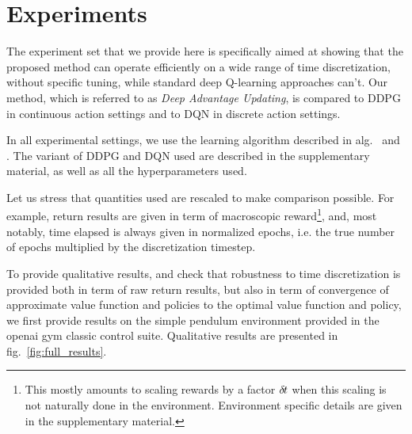 \section{Experiments}
\label{sec:exp}

The experiment set that we provide here is specifically aimed at showing that
the proposed method can operate efficiently on a wide range of time
discretization, without specific tuning, while standard deep Q-learning
approaches can't.  Our method, which is referred to as \emph{Deep Advantage
Updating}, is compared to DDPG in continuous action settings and to DQN in
discrete action settings.

In all experimental settings, we use the learning algorithm described in
alg.~\cite{alg:dau} and . The variant of DDPG and DQN
used are described in the supplementary material, as well as all the hyperparameters
used.

Let us stress that quantities used are rescaled to make comparison possible. For example,
return results are given in term of macroscopic reward\footnote{This mostly amounts to scaling rewards
by a factor ${\delta\hspace{-.1em}t}$ when this scaling is not naturally done in the environment. Environment specific
details are given in the supplementary material.}, and, most notably, time elapsed is always given in
normalized epochs, i.e. the true number of epochs multiplied by the discretization timestep.

To provide qualitative results, and check that robustness to time
discretization is provided both in term of raw return results, but also in term
of convergence of approximate value function and policies to the optimal
value function and policy, we first provide results on the simple pendulum environment
provided in the openai gym classic control suite. Qualitative results are presented in
fig.~\ref{fig:full_results}.

% 
